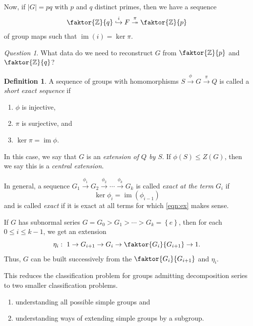 \documentclass[10pt,letterpaper,cm]{nupset}
\theoremstyle{definition}
\newtheorem{definition}{Definition}[subsection]
\theoremstyle{theorem}
\theoremstyle{remark}
\newtheorem*{question}{Question}
\newcommand{\Z}{\mathbb Z}
\newcommand{\1}{\mathbf{1}}
\newcommand{\0}{\vec 0}
\DeclareMathOperator{\im}{im}
\begin{document}
\bigskip


Now, if $\left\lvert{G}\right\rvert = pq$ with $p$ and $q$ distinct primes, then we have a sequence $$\faktor{\Z}{q} \overset{i}{\hookrightarrow} F \overset{\pi}{\twoheadrightarrow} \faktor{\Z}{p}$$ of group maps such that $\im(i) = \ker{\pi}$. 

\begin{question}
What data do we need to reconstruct $G$ from $\faktor{\Z}{p}$ and $\faktor{\Z}{q}$?
\end{question}


\begin{definition}
A sequence of groups with homomorphisms $S \overset{\phi}{\longrightarrow} G \overset{\pi}{\longrightarrow} Q$ is called a \textit{short exact sequence}  if
\begin{enumerate}[label=(\roman*)]
\item  $\phi$ is injective, 
\item $\pi$ is surjective, and 
\item $\ker{\pi} = \im{\phi}$. 
\end{enumerate}
In this case, we say that $G$ is an \textit{extension of $Q$ by $S$}. If $\phi(S) \leq Z(G)$, then we say this is a \textit{central extension}.
\end{definition}


In general, a sequence $G_1 \overset{\phi_1}{\longrightarrow} G_2 \overset{\phi_2}{\longrightarrow} \cdots \overset{\phi_k}{\longrightarrow} G_k$ is called \textit{exact at the term $G_i$} if 
\[\label{eqn:ex}
\ker{\phi_i} = \im(\phi_{i-1}) \tag{$\ast$}
\] and is called \textit{exact} if it is exact at all terms for which \eqref{eqn:ex} makes sense.

\medskip

If $G$ has subnormal series $G = G_0 > G_1 > \cdots > G_k = \left\{e\right\}$, then for each $0 \leq i \leq k-1$, we get an extension $$\eta_i :\ 1 \to G_{i+1} \to G_i \to \faktor{G_i}{G_{i+1}} \to 1.$$ Thus, $G$ can be built successively from the $\faktor{G_i}{G_{i+1}}$ and $\eta_i$.

\smallskip

This reduces the classification problem for groups admitting decomposition series to two smaller classification problems.
\begin{enumerate}[label=(\Roman*)]
\item understanding all possible simple groups and
\item understanding ways of extending simple groups by a subgroup.
\end{enumerate}
\end{document}
